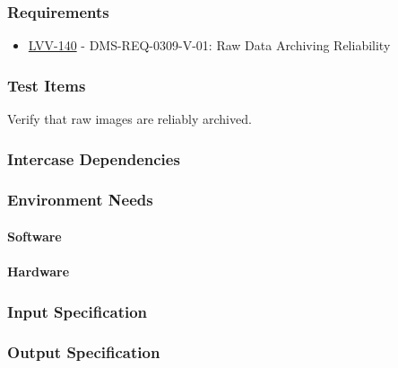 \subsubsection{Requirements}
\begin{itemize}
\item \href{https://jira.lsstcorp.org/browse/LVV-140}{LVV-140} - DMS-REQ-0309-V-01: Raw Data Archiving Reliability
\end{itemize}

\subsubsection{Test Items}
Verify that raw images are reliably archived.



\subsubsection{Intercase Dependencies}

\subsubsection{Environment Needs}

\paragraph{Software}

\paragraph{Hardware}

\subsubsection{Input Specification}

\subsubsection{Output Specification}

